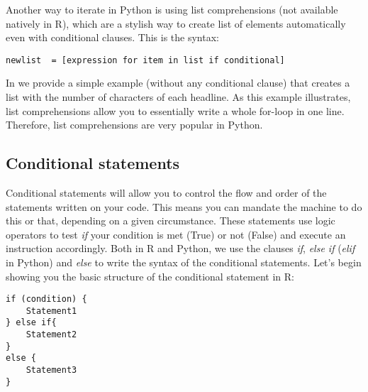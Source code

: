 

Another way to iterate in Python is using list comprehensions  (not available natively in R), which are a stylish way to create list of elements automatically even with conditional clauses. This is the syntax:

\begin{verbatim}
newlist  = [expression for item in list if conditional]
\end{verbatim}

In  we provide a simple example (without any
conditional clause) that creates a list with the number of characters
of each headline. As this example illustrates, list comprehensions
allow you to essentially write a whole for-loop in one
line. Therefore, list comprehensions are very popular in Python.




\subsection{Conditional statements}

Conditional statements will allow you to control the flow and order of
the statements written on your code. This means you can mandate the
machine to do this or that, depending on a given circumstance. These
statements use logic operators to test \emph{if} your condition is met
(True) or not (False) and execute an instruction accordingly. Both in
R and Python, we use the clauses \emph{if}, \emph{else if}
(\emph{elif} in Python) and \emph{else} to write the syntax of the
conditional statements. Let's begin showing you the basic structure of
the conditional statement in R:

\begin{verbatim}
if (condition) {
    Statement1
} else if{
    Statement2
}
else {
    Statement3
}
\end{verbatim}

